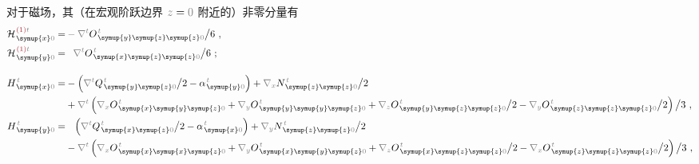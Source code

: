 对于磁场，其（在宏观阶跃边界 $\mathcolor{gray}{z \mathcolor{black}{=} 0}$ 附近的）非零分量有
\begin{subequations} \label{eq:H^(2-0)_0=}
\begin{align}
	{\mathcal{H}}^{\;\!\textcolor{Maroon}{(1)}\mathcolor{gray}{t}}_{\;\! \symup{x} \mathcolor{gray}{0}} = &- \mathcolor{gray}{\nabla^t}
	O^{\;\!\mathcolor{gray}{t}}_{\;\!\symup{y}\symup{z}\symup{z}\mathcolor{gray}{0}} \big/ 6~, \label{eq:H^(1)_x0=} \\
	{\mathcal{H}}^{\;\!\textcolor{Maroon}{(1)}\mathcolor{gray}{t}}_{\;\! \symup{y} \mathcolor{gray}{0}} = &\hphantom{+} \mathcolor{gray}{\nabla^t}
	O^{\;\!\mathcolor{gray}{t}}_{\;\!\symup{x}\symup{z}\symup{z}\mathcolor{gray}{0}} \big/ 6~; \label{eq:H^(1)_y0=} \\[1.0em]
	H^{\;\!\mathcolor{gray}{t}}_{\;\! \symup{x}\mathcolor{gray}{0}} = & - \left( \mathcolor{gray}{\nabla^t} Q^{\;\!\mathcolor{gray}{t}}_{\;\! \symup{y} \symup{z} \mathcolor{gray}{0}} \big/ 2 - 
	{\alpha}^{\;\!\mathcolor{gray}{t}}_{\;\! \symup{y}\mathcolor{gray}{0}} \right) + \mathcolor{gray}{\nabla_x} N^{\;\!\mathcolor{gray}{t}}_{\;\!\symup{z} \symup{z} \mathcolor{gray}{0}} \big/ 2 \label{eq:H_x0=} \\ & + \mathcolor{gray}{\nabla^t} \left( \mathcolor{gray}{\nabla_x} O^{\;\!\mathcolor{gray}{t}}_{\;\! \symup{x} \symup{y} \symup{z} \mathcolor{gray}{0}} + \mathcolor{gray}{\nabla_y}  O^{\;\!\mathcolor{gray}{t}}_{\;\! \symup{y} \symup{y} \symup{z} \mathcolor{gray}{0}} + \mathcolor{gray}{\nabla_z} O^{\;\!\mathcolor{gray}{t}}_{\;\! \symup{y} \symup{z} \symup{z} \mathcolor{gray}{0}} \big/ 2 - \mathcolor{gray}{\nabla_y} O^{\;\!\mathcolor{gray}{t}}_{\;\! \symup{z} \symup{z} \symup{z} \mathcolor{gray}{0}} \big/ 2 \right) \big/ 3~, \\
	H^{\;\!\mathcolor{gray}{t}}_{\;\! \symup{y}\mathcolor{gray}{0}} = &\hphantom{+} \left( \mathcolor{gray}{\nabla^t} Q^{\;\!\mathcolor{gray}{t}}_{\;\! \symup{x} \symup{z} \mathcolor{gray}{0}} \big/ 2 -
	{\alpha}^{\;\!\mathcolor{gray}{t}}_{\;\! \symup{x}\mathcolor{gray}{0}} \right) + \mathcolor{gray}{\nabla_y} N^{\;\!\mathcolor{gray}{t}}_{\;\! \symup{z} \symup{z} \mathcolor{gray}{0}} \big/ 2 \label{eq:H_y0=} \\ & - \mathcolor{gray}{\nabla^t} \left( \mathcolor{gray}{\nabla_x} O^{\;\!\mathcolor{gray}{t}}_{\;\! \symup{x} \symup{x} \symup{z} \mathcolor{gray}{0}} + \mathcolor{gray}{\nabla_y}  O^{\;\!\mathcolor{gray}{t}}_{\;\! \symup{x} \symup{y} \symup{z} \mathcolor{gray}{0}} + \mathcolor{gray}{\nabla_z}  O^{\;\!\mathcolor{gray}{t}}_{\;\! \symup{x} \symup{z} \symup{z} \mathcolor{gray}{0}} \big/ 2 - \mathcolor{gray}{\nabla_x}  O^{\;\!\mathcolor{gray}{t}}_{\;\! \symup{z} \symup{z} \symup{z} \mathcolor{gray}{0}} \big/ 2 \right) \big/ 3~, \\

\end{align}
\end{subequations}
